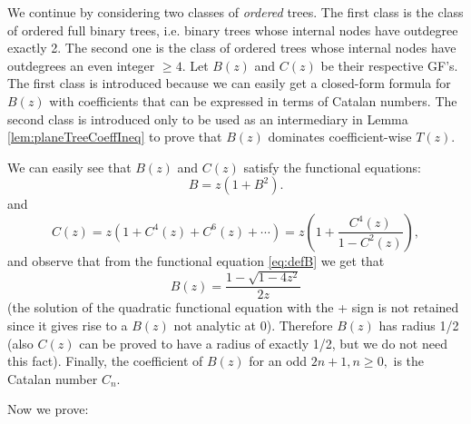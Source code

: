 \documentclass{amsart}
\theoremstyle{plain}
\begin{document}
We continue by considering two classes of {\em ordered} trees.  The first class 
is the class of ordered full binary trees, i.e. binary trees whose internal nodes have outdegree exactly 2. The second one 
is the class of ordered trees  whose internal nodes have outdegrees an even integer $\geq 4$.  Let $B(z)$ and $C(z)$ be their respective GF's. The first  class  is introduced because we can easily get a closed-form formula for $B(z)$ with coefficients that can be expressed in terms of Catalan numbers. The second  class   is introduced only to be used as an intermediary in Lemma \ref{lem:planeTreeCoeffIneq}  to prove that $B(z)$ dominates coefficient-wise $T(z)$.


We can easily see that $B(z)$ and $C(z)$ satisfy the functional equations:
\begin{equation}\label{eq:defB}
    B = z(1+B^2).
\end{equation}
and 
\begin{equation}\label{eq:defC} C(z) = z\left( 1+ C^4(z) + C^6(z) + \cdots \right) = z\left( 1+ \frac{C^4(z)}{1 - C^2(z)}\right),\end{equation}
and observe that from the functional equation \eqref{eq:defB} we get that 
\begin{equation}\label{eq:B2}
B(z) = \frac{1-\sqrt{1-4z^2}}{2z}
\end{equation}
(the solution of the  quadratic functional equation with the + sign is not retained since it gives rise to a $B(z)$ not analytic at 0).
Therefore  $B(z)$ has  radius 1/2 (also $C(z)$ can be proved to have a radius of exactly 1/2, but we do not need this fact). Finally, the coefficient of $B(z)$ for an odd $2n+1, n\geq 0,$ is the Catalan number $C_n$.

Now we prove:
\end{document}
